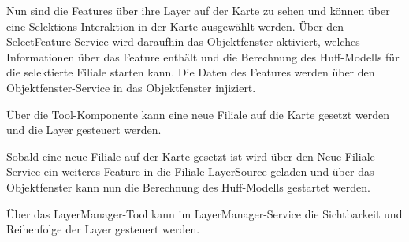 Nun sind die Features über ihre Layer auf der Karte zu sehen und können über eine Selektions-Interaktion in der Karte ausgewählt werden.
Über den SelectFeature-Service wird daraufhin das Objektfenster aktiviert, welches Informationen über das Feature enthält und die Berechnung des Huff-Modells für die selektierte Filiale starten kann.
Die Daten des Features werden über den Objektfenster-Service in das Objektfenster injiziert.

Über die Tool-Komponente kann eine neue Filiale auf die Karte gesetzt werden und die Layer gesteuert werden.

Sobald eine neue Filiale auf der Karte gesetzt ist wird über den Neue-Filiale-Service ein weiteres Feature in die Filiale-LayerSource geladen und über das Objektfenster kann nun die Berechnung des Huff-Modells gestartet werden.

Über das LayerManager-Tool kann im LayerManager-Service die Sichtbarkeit und Reihenfolge der Layer gesteuert werden.
